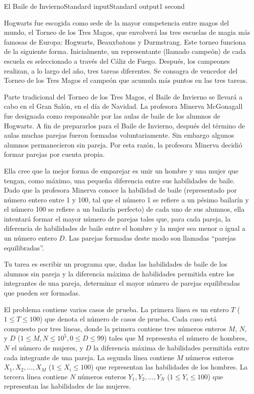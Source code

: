 \begin{problem}{El Baile de Invierno}{Standard input}{Standard output}{1 second}{}


Hogwarts fue escogida como sede de la mayor competencia entre magos del mundo, el Torneo de los Tres Magos, que envolverá las tres escuelas de magia más famosas de Europa: Hogwarts, Beauxbatons y Durmstrang. Este torneo funciona de la siguiente forma. Inicialmente, un representante (llamado campeón) de cada escuela es seleccionado a través del Cáliz de Fuego. Después, los campeones realizan, a lo largo del año, tres tareas diferentes. Se consagra de vencedor del Torneo de los Tres Magos el campeón  que acumula más puntos en las tres tareas.

Parte tradicional del Torneo de los Tres Magos, el Baile de Invierno se llevará a cabo en el Gran Salón, en el día de Navidad. La profesora Minerva McGonagall fue designada como responsable por las aulas de baile de los alumnos de Hogwarts. A fin de prepararlos para el Baile de Invierno, después del término de aulas muchas parejas fueron formadas voluntariamente. Sin embargo algunos alumnos permanecieron sin pareja. Por esta razón, la profesora Minerva decidió formar parejas por cuenta propia.

Ella cree que la mejor forma de emparejar es unir un hombre y una mujer que tengan, como máximo, una pequeña diferencia entre sus habilidades de baile. Dado que la profesora Minerva conoce la habilidad de baile (representado por número entero entre 1 y 100, tal que el número 1 se refiere a un pésimo bailarín y el número 100 se refiere a un bailarín perfecto) de cada uno de sus alumnos, ella intentará formar el mayor número de parejas tales que, para cada pareja, la diferencia de habilidades de baile entre el hombre y la mujer sea menor o igual a un número entero $D$. Las parejas formadas deste modo son llamadas “parejas equilibradas”.

Tu tarea es escribir un programa que, dadas las habilidades de baile de los alumnos sin pareja y la diferencia máxima de habilidades permitida entre los integrantes de una pareja, determinar el mayor número de parejas equilibradas que pueden ser formadas.

\InputFile
El problema contiene varios casos de prueba. La primera l\'inea es un entero $T$ ($1\leq T \leq 100$) que denota el número de casos de prueba. Cada caso está compuesto por tres lineas, donde la primera contiene tres números enteros $M$, $N$, y $D$ ($1 \leq M, N \leq 10^5, 0 \leq D \leq 99$) tales que M representa el número de hombres, $N$ el número de mujeres, y $D$ la diferencia máxima de habilidades permitida entre cada integrante de una pareja. La segunda línea contiene $M$ números enteros $X_1, X_2, \dots, X_M$ ($1 \leq X_i \leq 100$) que representan las habilidades de los hombres. La tercera línea contiene $N$ números enteros $Y_1, Y_2, \dots, Y_N$ ($1 \leq Y_i \leq 100$) que representan las habilidades de las mujeres.


\end{problem}
